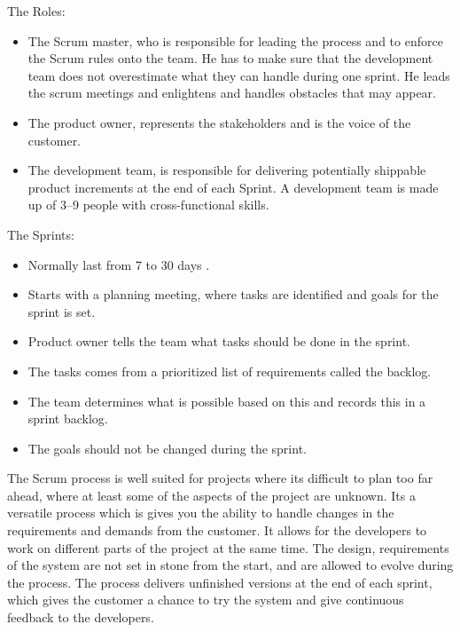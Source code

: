 The Roles: 
\begin{itemize}

\item The Scrum master, who is responsible for leading the process and to enforce the Scrum rules onto the team. He has to make sure that the development team does not overestimate what they can handle during one sprint. He leads the scrum meetings and enlightens and handles obstacles that may appear. 

\item The product owner, represents the stakeholders and is the voice of the customer.

\item The development team, is responsible for delivering potentially shippable product increments at the end of each Sprint. A development team is made up of 3–9 people with cross-functional skills.

\end{itemize}

The Sprints:
\begin{itemize}

\item Normally last from 7 to 30 days .
\item Starts with a planning meeting, where tasks are identified and goals for the sprint is set.
\item Product owner tells the team what tasks should be done in the sprint.
\item The tasks comes from a prioritized list of requirements called the backlog.
\item The team determines what is possible based on this and records this in a sprint backlog.
\item The goals should not be changed during the sprint.

\end{itemize}

The Scrum process is well suited for projects where its difficult to plan too far ahead, where at least some of the aspects of the project are unknown. Its a versatile process which is gives you the ability to handle changes in the requirements and demands from the customer. It allows for the developers to work on different parts of the project at the same time. The design, requirements of the system are not set in stone from the start, and are allowed to evolve during the process. The process delivers unfinished versions at the end of each sprint, which gives the customer a chance to try the system and give continuous feedback to the developers.

